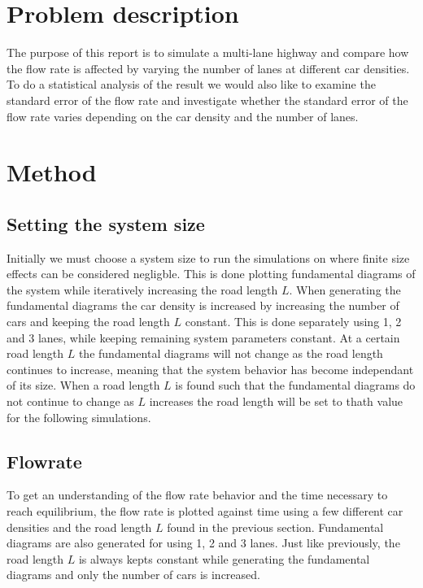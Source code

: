 \documentclass[a4paper,12pt]{article}
\begin{document}

\section*{Problem description}
The purpose of this report is to simulate a multi-lane highway and compare how the flow rate is affected by varying the number
of lanes at different car densities.
To do a statistical analysis of the result we would also like to examine the standard error of the flow rate and investigate whether the 
standard error of the flow rate varies depending on the car density and the number of lanes.

\section*{Method}
\subsection*{Setting the system size}
Initially we must choose a system size to run the simulations on where finite size effects can be considered negligble. This is done plotting fundamental
diagrams of the system while iteratively increasing the road length $L$. When generating the fundamental diagrams the car density is increased by increasing the number
of cars and keeping the road length $L$ constant. This is done separately using 1, 2 and 3 lanes, while keeping remaining system
parameters constant. At a certain road length $L$ the fundamental diagrams will not change as the road length
continues to increase, meaning that the system behavior has become independant of its size. When a road length $L$ is found such that the fundamental diagrams
do not continue to change as $L$ increases the road length will be set to thath value for the following simulations.

\subsection*{Flowrate}
To get an understanding of the flow rate behavior and the time necessary to reach equilibrium, the flow rate is plotted against time using a few different 
car densities and the road length $L$ found in the previous section. Fundamental diagrams are also generated for using 1, 2 and 3 lanes. Just like previously,
the road length $L$ is always kepts constant while generating the fundamental diagrams and only the number of cars is increased.
\end{document}

